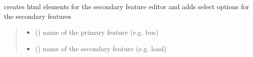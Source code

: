 \documentclass[letterpaper,10pt,english]{sphinxmanual}
\begin{document}
\begin{fulllineitems}
\label{\detokenize{docs_gui/js_api/network_editor/display_editable_network_features:populateEditableNetworkEditorSecondaryFeature}}
\pysigstartsignatures
{}
\pysigstopsignatures
\sphinxAtStartPar
creates html elements for the secondary feature editor and adds select options for the secondary features
\begin{quote}\begin{description}
\begin{itemize}
\item {} 
\sphinxAtStartPar
{} () \textendash{} name of the primary feature (e.g. bus)

\item {} 
\sphinxAtStartPar
{} () \textendash{} name of the secondary feature (e.g. load)

\end{itemize}

\end{description}\end{quote}

\end{fulllineitems}

\end{document}
